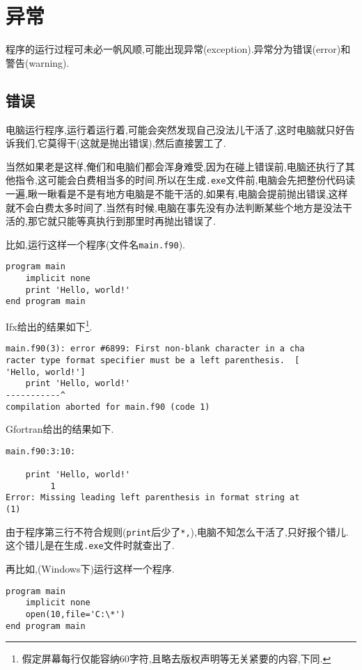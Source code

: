 \section{异常}\label{fortran_exception}

程序的运行过程可未必一帆风顺,可能出现异常(exception).异常分为错误(error)和警告(warning).

\subsection{错误}\label{fortran_error}

电脑运行程序,运行着运行着,可能会突然发现自己没法儿干活了,这时电脑就只好告诉我们,它莫得干(这就是抛出错误),然后直接罢工了.

当然如果老是这样,俺们和电脑们都会浑身难受,因为在碰上错误前,电脑还执行了其他指令,这可能会白费相当多的时间.所以在生成\texttt{.exe}文件前,电脑会先把整份代码读一遍,瞅一瞅看是不是有地方电脑是不能干活的,如果有,电脑会提前抛出错误,这样就不会白费太多时间了.当然有时候,电脑在事先没有办法判断某些个地方是没法干活的,那它就只能等真执行到那里时再抛出错误了.

比如,运行这样一个程序(文件名\texttt{main.f90}).
\begin{lstlisting}
program main
    implicit none
    print 'Hello, world!'
end program main
\end{lstlisting}

Ifx给出的结果如下\footnote{
    假定屏幕每行仅能容纳60字符,且略去版权声明等无关紧要的内容,下同.
}.
\begin{lstlisting}
main.f90(3): error #6899: First non-blank character in a cha
racter type format specifier must be a left parenthesis.  [
'Hello, world!']
    print 'Hello, world!'
-----------^
compilation aborted for main.f90 (code 1)
\end{lstlisting}

Gfortran给出的结果如下.
\begin{lstlisting}
main.f90:3:10:

    print 'Hello, world!'
         1
Error: Missing leading left parenthesis in format string at 
(1)
\end{lstlisting}

由于程序第三行不符合规则(\texttt{print}后少了\texttt{*,}),电脑不知怎么干活了,只好报个错儿.这个错儿是在生成\texttt{.exe}文件时就查出了.

再比如,(Windows下)运行这样一个程序.
\begin{lstlisting}
program main
    implicit none
    open(10,file='C:\*')
end program main
\end{lstlisting}

